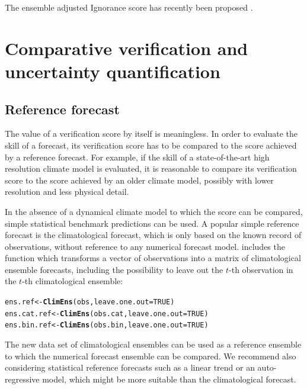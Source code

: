 \documentclass[article]{jss}\usepackage{graphicx, color}
\makeatletter
\newcommand{\hlfunctioncall}[1]{\textcolor[rgb]{0,0.501960784313725,0.752941176470588}{\textbf{#1}}}%
\newenvironment{kframe}{%
 \def\at@end@of@kframe{}%
 \ifinner\ifhmode%
  \def\at@end@of@kframe{\end{minipage}}%
  \begin{minipage}{\columnwidth}%
 \fi\fi%
 \def\FrameCommand##1{\hskip\@totalleftmargin \hskip-\fboxsep
 \colorbox{shadecolor}{##1}\hskip-\fboxsep
     \hskip-\linewidth \hskip-\@totalleftmargin \hskip\columnwidth}%
 \MakeFramed {\advance\hsize-\width
   \@totalleftmargin\z@ \linewidth\hsize
   \@setminipage}}%
 {\par\unskip\endMakeFramed%
 \at@end@of@kframe}
\newenvironment{knitrout}{}{} %
\makeatother
\begin{document}
The ensemble adjusted Ignorance score has recently been proposed \citep{siegert2015ignorance}.





\section{Comparative verification and uncertainty quantification}


\subsection{Reference forecast}

The value of a verification score by itself is meaningless.
In order to evaluate the skill of a forecast, its verification score has to be compared to the score achieved by a reference forecast.
For example, if the skill of a state-of-the-art high resolution climate model is evaluated, it is reasonable to compare its verification score to the score achieved by an older climate model, possibly with lower resolution and less physical detail.

In the absence of a dynamical climate model to which the score can be compared, simple statistical benchmark predictions can be used.
A popular simple reference forecast is the climatological forecast, which is only based on the known record of observations, without reference to any numerical forecast model.
 includes the function  which transforms a vector of observations into a matrix of climatological ensemble forecasts, including the possibility to leave out the $t$-th observation in the $t$-th climatological ensemble:

\begin{knitrout}
\color{fgcolor}\begin{kframe}
\begin{alltt}
ens.ref     <- \hlfunctioncall{ClimEns}(obs,     leave.one.out=TRUE)
ens.cat.ref <- \hlfunctioncall{ClimEns}(obs.cat, leave.one.out=TRUE)
ens.bin.ref <- \hlfunctioncall{ClimEns}(obs.bin, leave.one.out=TRUE)
\end{alltt}
\end{kframe}
\end{knitrout}


The new data set of climatological ensembles can be used as a reference ensemble to which the numerical forecast ensemble can be compared.
We recommend also considering statistical reference forecasts such as a linear trend or an auto-regressive model, which might be more suitable than the climatological forecast.
\end{document}
